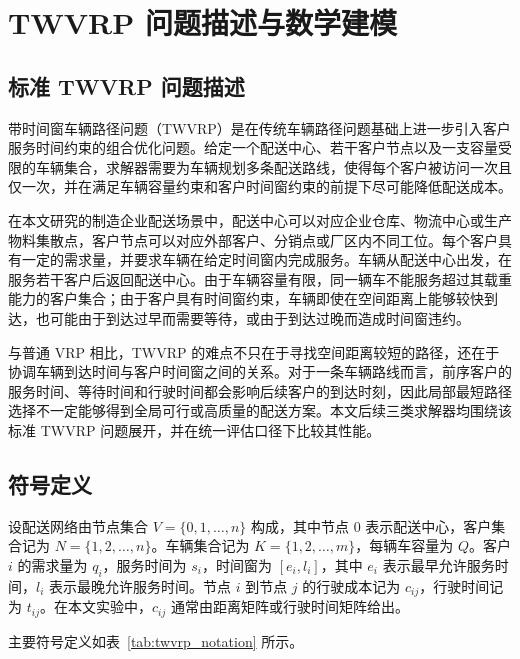 \documentclass[12pt,a4paper,UTF8]{article}
\begin{document}
\section{TWVRP 问题描述与数学建模}
\label{sec:twvrp_model}

\subsection{标准 TWVRP 问题描述}

带时间窗车辆路径问题（TWVRP）是在传统车辆路径问题基础上进一步引入客户服务时间约束的组合优化问题。给定一个配送中心、若干客户节点以及一支容量受限的车辆集合，求解器需要为车辆规划多条配送路线，使得每个客户被访问一次且仅一次，并在满足车辆容量约束和客户时间窗约束的前提下尽可能降低配送成本。

在本文研究的制造企业配送场景中，配送中心可以对应企业仓库、物流中心或生产物料集散点，客户节点可以对应外部客户、分销点或厂区内不同工位。每个客户具有一定的需求量，并要求车辆在给定时间窗内完成服务。车辆从配送中心出发，在服务若干客户后返回配送中心。由于车辆容量有限，同一辆车不能服务超过其载重能力的客户集合；由于客户具有时间窗约束，车辆即使在空间距离上能够较快到达，也可能由于到达过早而需要等待，或由于到达过晚而造成时间窗违约。

与普通 VRP 相比，TWVRP 的难点不只在于寻找空间距离较短的路径，还在于协调车辆到达时间与客户时间窗之间的关系。对于一条车辆路线而言，前序客户的服务时间、等待时间和行驶时间都会影响后续客户的到达时刻，因此局部最短路径选择不一定能够得到全局可行或高质量的配送方案。本文后续三类求解器均围绕该标准 TWVRP 问题展开，并在统一评估口径下比较其性能。

\subsection{符号定义}

设配送网络由节点集合 $V=\{0,1,\dots,n\}$ 构成，其中节点 $0$ 表示配送中心，客户集合记为 $N=\{1,2,\dots,n\}$。车辆集合记为 $K=\{1,2,\dots,m\}$，每辆车容量为 $Q$。客户 $i$ 的需求量为 $q_i$，服务时间为 $s_i$，时间窗为 $[e_i,l_i]$，其中 $e_i$ 表示最早允许服务时间，$l_i$ 表示最晚允许服务时间。节点 $i$ 到节点 $j$ 的行驶成本记为 $c_{ij}$，行驶时间记为 $t_{ij}$。在本文实验中，$c_{ij}$ 通常由距离矩阵或行驶时间矩阵给出。

主要符号定义如表~\ref{tab:twvrp_notation} 所示。
\end{document}
